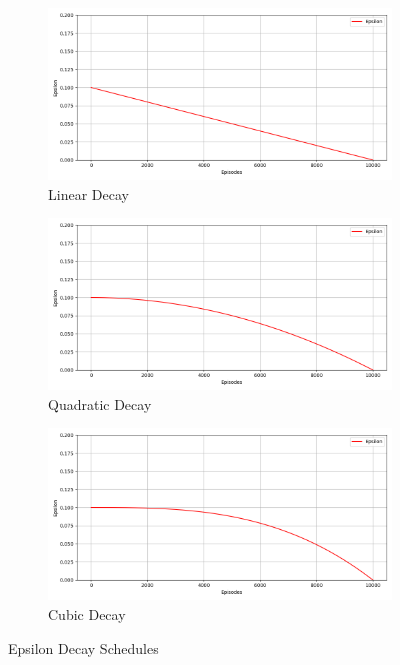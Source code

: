 \documentclass[a4paper,9pt]{scrartcl}
\begin{document}
\begin{figure}[H]
\centering
\begin{subfigure}[b]{0.32\textwidth}
\includegraphics[width=\textwidth]{images/q_learning_epsilon_avg(2)(0).png}
\caption{Linear Decay}
\label{fig:decay_linear}
\end{subfigure}
\hfill
\begin{subfigure}[b]{0.32\textwidth}
\includegraphics[width=\textwidth]{images/q_learning_epsilon_avg(2)(1).png}
\caption{Quadratic Decay}
\label{fig:decay_quadratic}
\end{subfigure}
\hfill
\begin{subfigure}[b]{0.32\textwidth}
\includegraphics[width=\textwidth]{images/q_learning_epsilon_avg(2)(2).png}
\caption{Cubic Decay}
\label{fig:decay_cubic}
\end{subfigure}
\caption{Epsilon Decay Schedules}
\label{fig:decay_schedules}
\end{figure}
\end{document}
